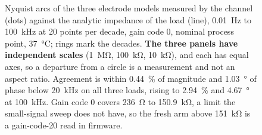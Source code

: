 \begin{figure}[htbp]
{}
  \caption[{Nyquist arcs of the three electrode models, measured against
  analytic.}]{Nyquist arcs of the three electrode models measured by the
  channel (dots) against the analytic impedance of the load (line),
  \SI{0.01}{\hertz} to \SI{100}{\kilo\hertz} at \num{20} points per decade,
  gain code 0, nominal process point, \SI{37}{\celsius}; rings mark the
  decades. \textbf{The three panels have independent scales}
  (\SI{1}{\mega\ohm}, \SI{100}{\kilo\ohm}, \SI{10}{\kilo\ohm}), and each has
  equal axes, so a departure from a circle is a measurement and not an aspect
  ratio. Agreement is within \SI{0.44}{\percent} of magnitude and
  \SI{1.03}{\degree} of phase below \SI{20}{\kilo\hertz} on all three loads,
  rising to \SI{2.94}{\percent} and \SI{4.67}{\degree} at
  \SI{100}{\kilo\hertz}. Gain code 0 covers \SI{236}{\ohm} to
  \SI{150.9}{\kilo\ohm}, a limit the small-signal sweep does not have, so the
  fresh arm above \SI{151}{\kilo\ohm} is a gain-code-20 read in firmware.}
  \label{fig:eis-nyquist}
\end{figure}
